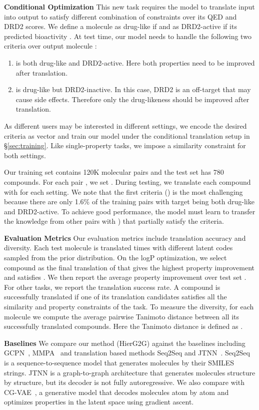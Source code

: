 \documentclass{article} \usepackage{iclr2020_conference,times}
\begin{document}
\textbf{Conditional Optimization } This new task requires the model to translate input  into output  to satisfy different combination of constraints over its QED and DRD2 scores. We define a molecule  as drug-like if  and as DRD2-active if its predicted bioactivity . At test time, our model needs to handle the following two criteria over output molecule :
\begin{enumerate}[leftmargin=*,topsep=0pt,itemsep=0pt] 
    \item  is both drug-like and DRD2-active. Here both properties need to be improved after translation.
    \item  is drug-like but DRD2-inactive. In this case, DRD2 is an off-target that may cause side effects. Therefore only the drug-likeness should be improved after translation.
\end{enumerate}
As different users may be interested in different settings, we encode the desired criteria as vector  and train our model under the conditional translation setup in \S\ref{sec:training}. 
Like single-property tasks, we impose a similarity constraint  for both settings.

Our training set contains 120K molecular pairs and the test set has 780 compounds. For each pair , we set .
During testing, we translate each compound with  for each setting.
We note that the first criteria () is the most challenging because there are only 1.6\% of the training pairs with target  being both drug-like and DRD2-active.
To achieve good performance, the model must learn to transfer the knowledge from other pairs with ) that partially satisfy the criteria.

\textbf{Evaluation Metrics } Our evaluation metrics include translation accuracy and diversity. Each test molecule  is translated  times with different latent codes sampled from the prior distribution. On the logP optimization, we select compound  as the final translation of  that gives the highest property improvement and satisfies . We then report the average property improvement  over test set . For other tasks, we report the translation success rate. A compound is successfully translated if one of its  translation candidates satisfies all the similarity and property constraints of the task.
To measure the diversity, for each molecule we compute the average pairwise Tanimoto distance between all its successfully translated compounds. Here the Tanimoto distance is defined as .

\textbf{Baselines } We compare our method (HierG2G) against the baselines including GCPN~\citep{you2018graph}, MMPA~\citep{dalke2018mmpdb} and translation based methods Seq2Seq and JTNN~\citep{jin2018learning}.
Seq2Seq is a sequence-to-sequence model that generates molecules by their SMILES strings. 
JTNN is a graph-to-graph architecture that generates molecules structure by structure, but its decoder is not fully autoregressive. 
We also compare with CG-VAE~\citep{liu2018constrained}, a generative model that decodes molecules atom by atom and optimizes properties in the latent space using gradient ascent.
\end{document}
